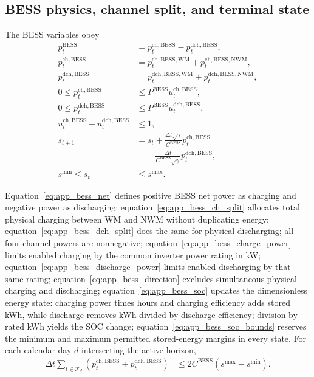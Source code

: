 \documentclass[final,5p,times]{elsarticle}
\newcommand{\dt}{\Delta t}
\newcommand{\BESS}{\mathrm{BESS}}
\newcommand{\WM}{\mathrm{WM}}
\newcommand{\NWM}{\mathrm{NWM}}
\newcommand{\ch}{\mathrm{ch}}
\newcommand{\dch}{\mathrm{dch}}
\newcommand{\calT}{\mathcal{T}}
\begin{document}
\subsection{BESS physics, channel split, and terminal state}
The BESS variables obey
\begin{align}
p_t^{\BESS}&=p_t^{\ch,\BESS}-p_t^{\dch,\BESS}, \label{eq:app_bess_net}\\
p_t^{\ch,\BESS}&=p_t^{\ch,\BESS,\WM}
+p_t^{\ch,\BESS,\NWM}, \label{eq:app_bess_ch_split}\\
p_t^{\dch,\BESS}&=p_t^{\dch,\BESS,\WM}
+p_t^{\dch,\BESS,\NWM}, \label{eq:app_bess_dch_split}\\
0\le p_t^{\ch,\BESS}&\le P^{\BESS}u_t^{\ch,\BESS}, \label{eq:app_bess_charge_power}\\
0\le p_t^{\dch,\BESS}&\le P^{\BESS}u_t^{\dch,\BESS}, \label{eq:app_bess_discharge_power}\\
u_t^{\ch,\BESS}+u_t^{\dch,\BESS}&\le1, \label{eq:app_bess_direction}\\
s_{t+1}&=s_t+\frac{\dt\sqrt{\gamma}}{C^{\BESS}}
p_t^{\ch,\BESS}\nonumber\\
&\quad-\frac{\dt}{C^{\BESS}\sqrt{\gamma}}
p_t^{\dch,\BESS}, \label{eq:app_bess_soc}\\
s^{\min}\le s_t&\le s^{\max}. \label{eq:app_bess_soc_bounds}
\end{align}

Equation~\eqref{eq:app_bess_net} defines positive BESS net power as charging and negative power as discharging; equation~\eqref{eq:app_bess_ch_split} allocates total physical charging between WM and NWM without duplicating energy; equation~\eqref{eq:app_bess_dch_split} does the same for physical discharging; all four channel powers are nonnegative; equation~\eqref{eq:app_bess_charge_power} limits enabled charging by the common inverter power rating in kW; equation~\eqref{eq:app_bess_discharge_power} limits enabled discharging by that same rating; equation~\eqref{eq:app_bess_direction} excludes simultaneous physical charging and discharging; equation~\eqref{eq:app_bess_soc} updates the dimensionless energy state: charging power times hours and charging efficiency adds stored kWh, while discharge removes kWh divided by discharge efficiency; division by rated kWh yields the SOC change; equation~\eqref{eq:app_bess_soc_bounds} reserves the minimum and maximum permitted stored-energy margins in every state.
For each calendar day $d$ intersecting the active horizon,
\begin{align}
\dt\sum_{t\in\calT_d}
\left(p_t^{\ch,\BESS}+p_t^{\dch,\BESS}\right)
&\le2C^{\BESS}(s^{\max}-s^{\min}). \label{eq:app_bess_throughput}
\end{align}
\end{document}
